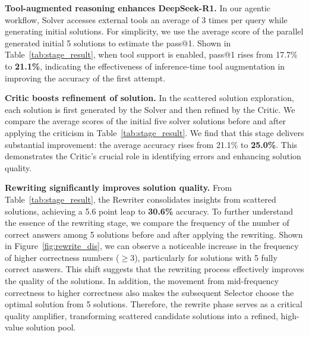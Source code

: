 \documentclass{article}
\begin{document}
\textbf{Tool-augmented reasoning enhances DeepSeek-R1.} In our agentic workflow, Solver accesses external tools an average of 3 times per query while generating initial solutions. For simplicity, we use the average score of the parallel generated initial 5 solutions to estimate the pass@1. Shown in Table~\ref{tab:stage_result}, when tool support is enabled, pass@1 rises from 17.7\% to \textbf{21.1\%}, indicating the effectiveness of inference-time tool augmentation in improving the accuracy of the first attempt. 

\textbf{Critic boosts refinement of solution.} In the scattered solution exploration, each solution is first generated by the Solver and then refined by the Critic.
We compare the average scores of the initial five solver solutions before and after applying the criticism in Table~\ref{tab:stage_result}. We find that this stage delivers substantial improvement: the average accuracy rises from 21.1\% to \textbf{25.0\%}. This demonstrates the Critic's crucial role in identifying errors and enhancing solution quality.


\textbf{Rewriting significantly improves solution quality.} From Table~\ref{tab:stage_result}, the Rewriter consolidates insights from scattered solutions, achieving a 5.6 point leap to \textbf{30.6\%} accuracy. To further understand the essence of the rewriting stage, we compare the frequency of the number of correct answers among 5 solutions before and after applying the rewriting. Shown in Figure~\ref{fig:rewrite_dis}, we can observe a noticeable increase in the frequency of higher correctness numbers ($\geq3$), particularly for solutions with 5 fully correct answers. This shift suggests that the rewriting process effectively improves the quality of the solutions. In addition, the movement from mid-frequency correctness to higher correctness also makes the subsequent Selector choose the optimal solution from 5 solutions. Therefore, the rewrite phase serves as a critical quality amplifier, transforming scattered candidate solutions into a refined, high-value solution pool.
\end{document}
